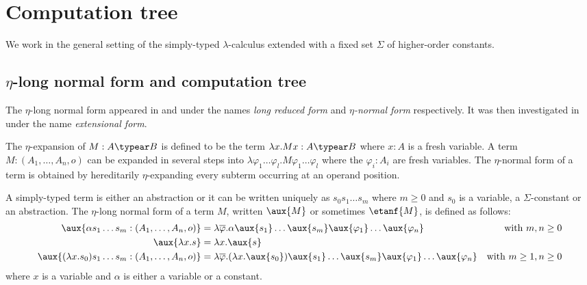 %

\section{Computation tree}
We work in the general setting of the simply-typed
$\lambda$-calculus extended with a fixed set $\Sigma$ of
higher-order constants.

\subsection{$\eta$-long normal form and computation tree}

The $\eta$-long normal form appeared in
\citep{DBLP:journals/tcs/JensenP76} and
\citep{DBLP:journals/tcs/Huet75} under the names \emph{long reduced
form} and \emph{$\eta$-normal form} respectively. It was then
investigated in \citep{huet76} under the name \emph{extensional
form}.

The $\eta$-expansion of $M: A\typear B$ is defined to be the term
$\lambda x . M x : A\typear B$ where $x:A$ is a fresh variable. A
term $M : (A_1,\ldots,A_n,o)$ can be expanded in several steps into
$\lambda \varphi_1 \ldots \varphi_l . M \varphi_1 \ldots \varphi_l$
where the $\varphi_i:A_i$ are fresh variables. The $\eta$-normal
form of a term is obtained by hereditarily $\eta$-expanding every
subterm occurring at an operand position.

\begin{dfn}
A simply-typed term is either an abstraction or it can be written uniquely as
$s_0 s_1 \ldots s_m$ where $m\geq0$ and $s_0$ is a variable, a $\Sigma$-constant or an abstraction.
The $\eta$-long normal form of a term $M$, written $\aux{M}$ or sometimes $\etanf{M}$,
is defined as follows:
\begin{align*}
\aux{\alpha s_1 \ldots s_m : (A_1,\ldots,A_n,o)} &= \lambda \overline{\varphi} . \alpha \aux{s_1}\ldots \aux{s_m} \aux{\varphi_1} \ldots \aux{\varphi_n}
& \mbox{with $m,n\geq0$}\\
\aux{\lambda x . s } &= \lambda x . \aux{s} \\
\aux{(\lambda x . s_0) s_1 \ldots s_m : (A_1,\ldots,A_n,o) } &= \lambda \overline{\varphi} . (\lambda x . \aux{s_0}) \aux{s_1} \ldots \aux{s_m} \aux{\varphi_1} \ldots \aux{\varphi_n}
& \mbox{with $m\geq 1,n\geq0$}
\end{align*}
where $x$ is a variable and $\alpha$ is either a variable or a constant.
\end{dfn}

